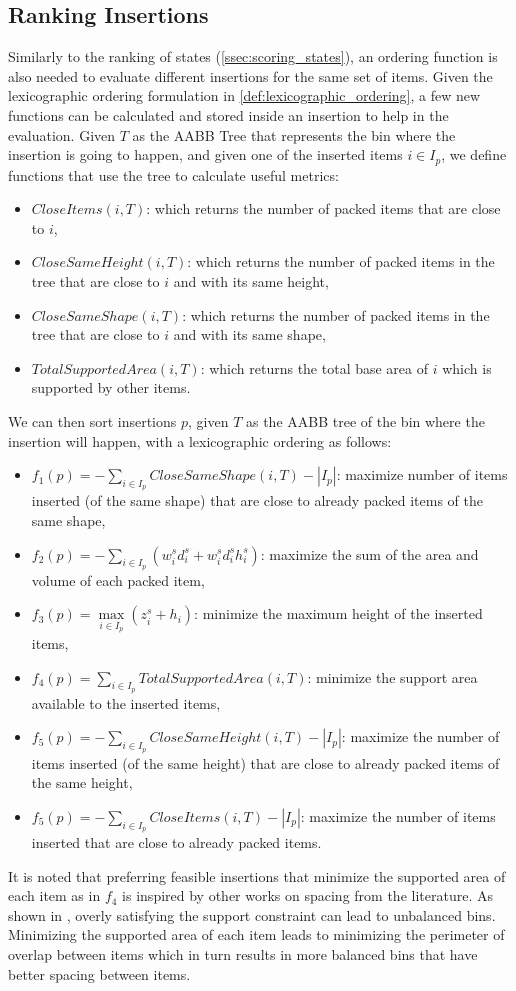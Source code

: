 \subsection{Ranking Insertions}
\label{ssec:scoring_insertions}%
Similarly to the ranking of states (\cref{ssec:scoring_states}), an ordering function is also needed to evaluate different insertions for the same set of items.
Given the lexicographic ordering formulation in \cref{def:lexicographic_ordering}, a few new functions can be calculated and stored inside an insertion to help in the evaluation.
Given $T$ as the AABB Tree that represents the bin where the insertion is going to happen, and given one of the inserted items $i \in I_p$, we define functions that use the tree to calculate useful metrics:
\begin{itemize}
    \item $CloseItems(i, T)$: which returns the number of packed items that are close to $i$,
    \item $CloseSameHeight(i, T)$: which returns the number of packed items in the tree that are close to $i$ and with its same height,
    \item $CloseSameShape(i, T)$: which returns the number of packed items in the tree that are close to $i$ and with its same shape,
    \item $TotalSupportedArea(i, T)$: which returns the total base area of $i$ which is supported by other items.
\end{itemize}
We can then sort insertions $p$, given $T$ as the AABB tree of the bin where the insertion will happen, with a lexicographic ordering as follows:
\begin{itemize}
    \item $f_1(p) = -\sum\limits_{i \in I_p}{CloseSameShape(i, T)} - |I_p|$: maximize number of items inserted (of the same shape) that are close to already packed items of the same shape,
    \item $f_2(p) = -\sum\limits_{i \in I_p}{(w^s_i d^s_i + w^s_i d^s_i h^s_i)}$: maximize the sum of the area and volume of each packed item,
    \item $f_3(p) = \max\limits_{i \in I_p}(z^s_i + h_i)$: minimize the maximum height of the inserted items,
    \item $f_4(p) = \sum\limits_{i \in I_p}{TotalSupportedArea(i, T)}$: minimize the support area available to the inserted items,
    \item $f_5(p) = -\sum\limits_{i \in I_p}{CloseSameHeight(i, T)} - |I_p|$: maximize the number of items inserted (of the same height) that are close to already packed items of the same height,
    \item $f_5(p) = -\sum\limits_{i \in I_p}{CloseItems(i, T)} - |I_p|$: maximize the number of items inserted that are close to already packed items.
\end{itemize}
It is noted that preferring feasible insertions that minimize the supported area of each item as in $f_4$ is inspired by other works on spacing from the literature.
As shown in \cite{elhedhli2019three}, overly satisfying the support constraint can lead to unbalanced bins.
Minimizing the supported area of each item leads to minimizing the perimeter of overlap between items which in turn results in more balanced bins that have better spacing between items.